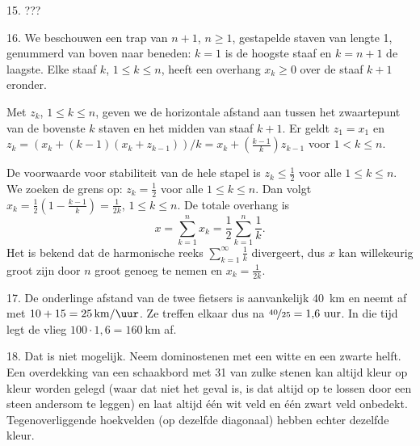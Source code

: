 \begin{problem}{15.}
    ???
\end{problem}

\begin{problem}{16.}
    We beschouwen een trap van $n+1$, $n \geq 1$, gestapelde staven van lengte 1, genummerd van boven naar beneden: $k = 1$ is de hoogste staaf en $k = n+1$ de laagste. Elke staaf $k$, $1 \leq k \leq n$, heeft een overhang $x_k \geq 0$ over de staaf $k+1$ eronder.

    Met $z_k$, $1 \leq k \leq n$, geven we de horizontale afstand aan tussen het zwaartepunt van de bovenste $k$ staven en het midden van staaf $k+1$. Er geldt $z_1 = x_1$ en $z_k = (x_k + (k - 1) (x_k + z_{k-1})) / k = x_k + \left( \frac{k-1}{k} \right) z_{k-1}$ voor $1 < k \leq n$.

    De voorwaarde voor stabiliteit van de hele stapel is $z_k \leq \frac{1}{2}$ voor alle $1 \leq k \leq n$. We zoeken de grens op: $z_k = \frac{1}{2}$ voor alle $1 \leq k \leq n$. Dan volgt $x_k = \frac{1}{2} \left( 1 - \frac{k-1}{k} \right) = \frac{1}{2 k}$, $1 \leq k \leq n$. De totale overhang is
    \begin{equation*}
        x = \textstyle\sum\limits_{k=1}^{n} x_k = \frac{1}{2} \textstyle\sum\limits_{k=1}^{n} \frac{1}{k}.
    \end{equation*}
    Het is bekend dat de harmonische reeks $\sum\limits_{k=1}^{\infty} \frac{1}{k}$ divergeert, dus $x$ kan willekeurig groot zijn door $n$ groot genoeg te nemen en $x_k = \frac{1}{2 k}$.
\end{problem}

\begin{problem}{17.}
    De onderlinge afstand van de twee fietsers is aanvankelijk \SI{40}{\km} en neemt af met $10 + 15 = \SI{25}{\km\per\uur}$. Ze treffen elkaar dus na $\nicefrac{40}{25} = 1{,}6 \text{ uur}$. In die tijd legt de vlieg $100 \cdot 1{,}6 = \SI{160}{\km}$ af.
\end{problem}

\begin{problem}{18.}
    Dat is niet mogelijk. Neem dominostenen met een witte en een zwarte helft. Een overdekking van een schaakbord met 31 van zulke stenen kan altijd kleur op kleur worden gelegd (waar dat niet het geval is, is dat altijd op te lossen door een steen andersom te leggen) en laat altijd één wit veld en één zwart veld onbedekt. Tegenoverliggende hoekvelden (op dezelfde diagonaal) hebben echter dezelfde kleur.
\end{problem}

